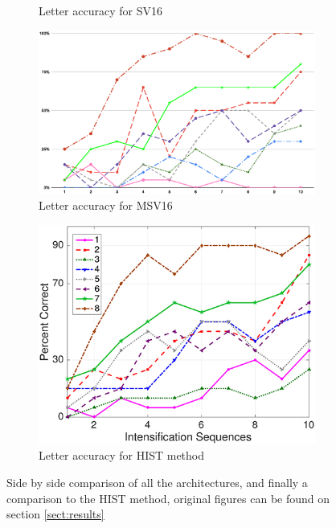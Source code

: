 \documentclass[conference]{IEEEtran}
\begin{document}
\begin{figure}[h]
\begin{subfigure}[t]{0.5\textwidth}
    \caption{Letter accuracy for SV16 \label{image:v2intensification2}}
    \end{subfigure}
    \begin{subfigure}[t]{0.5\textwidth}
    \centering\captionsetup{width=.8\linewidth}
    \includegraphics[width=1\linewidth, keepaspectratio]{images/v3intensificationnolabel.eps}
    \caption{Letter accuracy for MSV16 \label{image:v3intensification2}}
    \end{subfigure}
    \begin{subfigure}[t]{0.5\textwidth}
    \centering\captionsetup{width=.8\linewidth}
    \includegraphics[width=0.7\linewidth, keepaspectratio]{images/histintensification.jpg}
    \caption{Letter accuracy for HIST method \cite{ramele2019histogram} \label{image:histintensification}}
    \end{subfigure}
    
    \caption[Letter accuracy for all architectures ]{Side by side comparison of all the architectures, and finally a comparison to the HIST method, original figures can be found on section \ref{sect:results}}\label{image:allversionsiaccuracy}
\end{figure}
\end{document}
